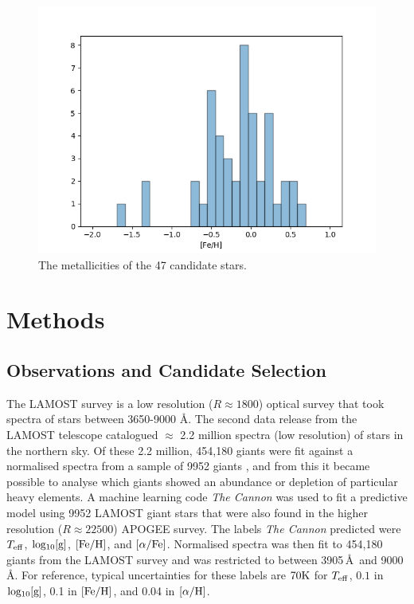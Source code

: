 \documentclass[a4paper,fleqn,usenatbib]{mnras}
\begin{document}
	\begin{figure}
		\includegraphics[width=\columnwidth]{metalhistpython}
		\caption{The metallicities of the 47 candidate stars.}
		\label{fig:starindex_423451}
	\end{figure}
	
	\section{Methods}
	
	\subsection{Observations and Candidate Selection}
	
	The LAMOST survey is a low resolution ($R\approx1800$) optical survey that took spectra of stars between 3650-9000 \AA. The second data release from the LAMOST telescope catalogued $\approx$ 2.2 million spectra (low resolution) of stars in the northern sky. Of these 2.2 million, 454,180 giants were fit against a normalised spectra from a sample of 9952 giants \citep{AnnaHo2017}, and from this it became possible to analyse which giants showed an abundance or depletion of particular heavy elements. A machine learning code \textit{The Cannon} was used to fit a predictive model using 9952 LAMOST giant stars that were also found in the higher resolution ($R\approx22500$) APOGEE survey. The labels \textit{The Cannon} predicted were $T_{\rm{eff}}$, $\rm{log_{10}[g]}$, $\rm{[Fe/H]}$, and $\rm{[\alpha/Fe]}$. Normalised spectra was then fit to 454,180 giants from the LAMOST survey and was restricted to between 3905\,\AA\ and 9000\,\AA. For reference, typical uncertainties for these labels are $70\rm{K}$ for $T_{\rm{eff}}$, $0.1$ in $\rm{log_{10}[g]}$, 0.1 in $\rm{[Fe/H]}$, and 0.04 in $\rm{[\alpha/H]}$.
	
\end{document}
